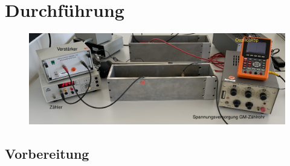 \section{Durchführung}
\label{sec:durchführung}

\begin{figure}[H]
	\centering
	\includegraphics[width=0.9\linewidth]{content/grafik/aufbau.jpg}
	\caption{}
	\label{fig:aufbau}
\end{figure}

\subsection{Vorbereitung}

\newpage
